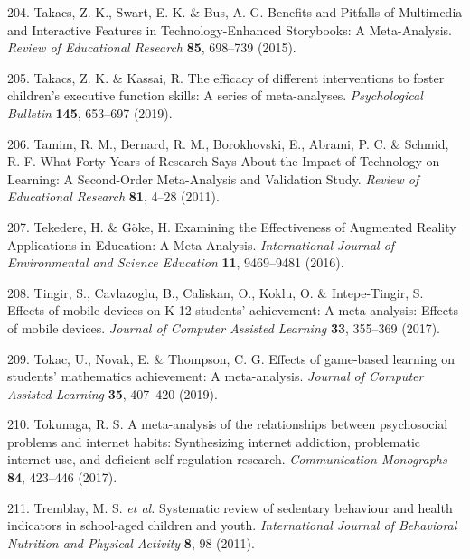 \documentclass[
  english,
  man]{apa6}
\newenvironment{cslreferences}%
  {}%
  {\par}
\begin{document}
\begin{cslreferences}
\leavevmode\hypertarget{ref-takacsBenefitsPitfallsMultimedia2015}{}%
204. Takacs, Z. K., Swart, E. K. \& Bus, A. G. Benefits and Pitfalls of Multimedia and Interactive Features in Technology-Enhanced Storybooks: A Meta-Analysis. \emph{Review of Educational Research} \textbf{85}, 698--739 (2015).

\leavevmode\hypertarget{ref-takacsEfficacyDifferentInterventions2019}{}%
205. Takacs, Z. K. \& Kassai, R. The efficacy of different interventions to foster children's executive function skills: A series of meta-analyses. \emph{Psychological Bulletin} \textbf{145}, 653--697 (2019).

\leavevmode\hypertarget{ref-tamimWhatFortyYears2011}{}%
206. Tamim, R. M., Bernard, R. M., Borokhovski, E., Abrami, P. C. \& Schmid, R. F. What Forty Years of Research Says About the Impact of Technology on Learning: A Second-Order Meta-Analysis and Validation Study. \emph{Review of Educational Research} \textbf{81}, 4--28 (2011).

\leavevmode\hypertarget{ref-tekedereExaminingEffectivenessAugmented2016}{}%
207. Tekedere, H. \& Göke, H. Examining the Effectiveness of Augmented Reality Applications in Education: A Meta-Analysis. \emph{International Journal of Environmental and Science Education} \textbf{11}, 9469--9481 (2016).

\leavevmode\hypertarget{ref-tingirEffectsMobileDevices2017}{}%
208. Tingir, S., Cavlazoglu, B., Caliskan, O., Koklu, O. \& Intepe-Tingir, S. Effects of mobile devices on K-12 students' achievement: A meta-analysis: Effects of mobile devices. \emph{Journal of Computer Assisted Learning} \textbf{33}, 355--369 (2017).

\leavevmode\hypertarget{ref-tokacEffectsGamebasedLearning2019}{}%
209. Tokac, U., Novak, E. \& Thompson, C. G. Effects of game-based learning on students' mathematics achievement: A meta-analysis. \emph{Journal of Computer Assisted Learning} \textbf{35}, 407--420 (2019).

\leavevmode\hypertarget{ref-tokunagaMetaanalysisRelationshipsPsychosocial2017}{}%
210. Tokunaga, R. S. A meta-analysis of the relationships between psychosocial problems and internet habits: Synthesizing internet addiction, problematic internet use, and deficient self-regulation research. \emph{Communication Monographs} \textbf{84}, 423--446 (2017).

\leavevmode\hypertarget{ref-tremblaySystematicReviewSedentary2011}{}%
211. Tremblay, M. S. \emph{et al.} Systematic review of sedentary behaviour and health indicators in school-aged children and youth. \emph{International Journal of Behavioral Nutrition and Physical Activity} \textbf{8}, 98 (2011).


\end{cslreferences}
\end{document}
